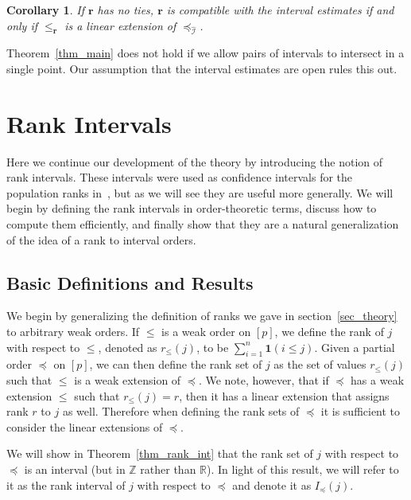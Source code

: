 \documentclass[12pt]{article}
\newcommand{\ind}[1]{\mathbf{1}(#1)}
\newcommand{\iord}{{\preceq_{\hat{\mathcal{I}}}}}
\newcommand{\rord}[1][\mathbf{r}]{{\leqslant_{#1}}}
\numberwithin{theorem}{section}
\newtheorem{corollary}[theorem]{Corollary}
\begin{document}
\begin{corollary}
\label{cor_main}
If $\mathbf{r}$ has no ties, $\mathbf{r}$ is compatible with the interval estimates if and only if $\rord$ is a linear extension of $\iord$.
\end{corollary}

Theorem~\ref{thm_main} does not hold if we allow pairs of intervals to intersect in a single point.  Our assumption that the interval estimates are open rules this out.

\section{Rank Intervals}
\label{sec_rank_int}

Here we continue our development of the theory by introducing the notion of rank intervals.  These intervals were used as confidence intervals for the population ranks in~\cite{klein2020jointCR}, but as we will see they are useful more generally.  We will begin by defining the rank intervals in order-theoretic terms, discuss how to compute them efficiently, and finally show that they are a natural generalization of the idea of a rank to interval orders.

\subsection{Basic Definitions and Results}
\label{subsec_rank_int_basics}

We begin by generalizing the definition of ranks we gave in section~\ref{sec_theory} to arbitrary weak orders.  If $\leqslant$ is a weak order on $[p]$, we define the rank of $j$ with respect to $\leqslant$, denoted as $r_\leqslant(j)$, to be $\sum_{i = 1}^n \ind{i \leqslant j}$.  Given a partial order $\preceq$ on $[p]$, we can then define the rank set of $j$ as the set of values $r_\leqslant(j)$ such that $\leqslant$ is a weak extension of $\preceq$.  We note, however, that if $\preceq$ has a weak extension $\leqslant$ such that $r_\leqslant(j) = r$, then it has a linear extension that assigns rank $r$ to $j$ as well.  Therefore when defining the rank sets of $\preceq$ it is sufficient to consider the linear extensions of $\preceq$.

We will show in Theorem~\ref{thm_rank_int} that the rank set of $j$ with respect to $\preceq$ is an interval (but in $\mathbb{Z}$ rather than $\mathbb{R}$).  In light of this result, we will refer to it as the rank interval of $j$ with respect to $\preceq$ and denote it as $I_\preceq(j)$.
\end{document}
